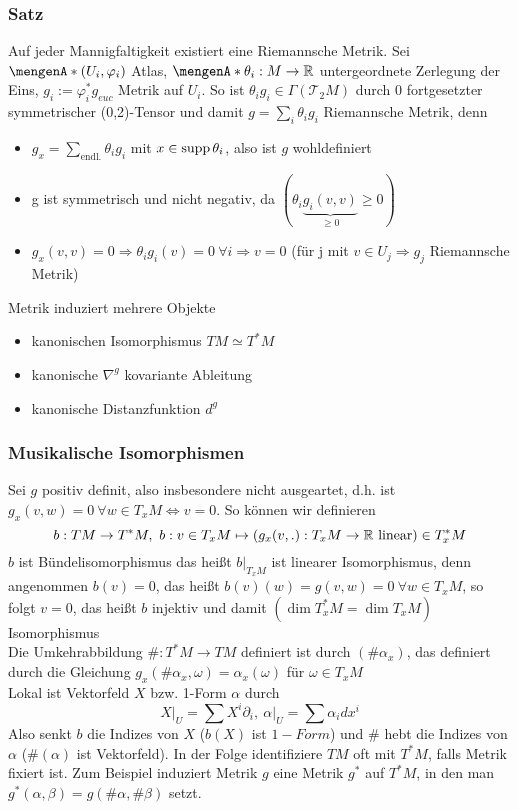 \subsubsection{Satz}
\label{ssub:25}
Auf jeder Mannigfaltigkeit existiert eine Riemannsche Metrik.
Sei $\set{(U_i,\varphi_i)}$ Atlas, $\set{\theta_i:M\to\mathds{R}}$ untergeordnete Zerlegung der Eins, $g_i:=\varphi_i^*g_{euc}$ Metrik auf $U_i$. So ist $\theta_i g_i\in\Gamma(\mathcal{T}_2 M)$ durch 0 fortgesetzter symmetrischer (0,2)-Tensor und damit $g=\sum_i \theta_i g_i$ Riemannsche Metrik, denn 
\begin{itemize}
\item $g_x=\sum_{\text{endl.}} \theta_i g_i$ mit $x\in \operatorname{supp} \theta_i$, also ist $g$ wohldefiniert
\item g ist symmetrisch und nicht negativ, da $(\theta_i\underset{\geq 0}{\underbrace{g_i(v,v)}}\geq 0)$
\item $g_x(v,v)=0\Rightarrow \theta_ig_i(v)=0~\forall i\Rightarrow v=0$ (für j mit $v\in U_j\Rightarrow g_j$ Riemannsche Metrik)
\end{itemize}

Metrik induziert mehrere Objekte 
\begin{itemize}
\item kanonischen Isomorphismus $TM\simeq T^*M$
\item kanonische $\nabla^g$ kovariante Ableitung
\item kanonische Distanzfunktion $d^g$
\end{itemize}

\subsubsection{Musikalische Isomorphismen}
\label{ssub:26}
Sei $g$ positiv definit, also insbesondere nicht ausgeartet, d.h. ist $g_x(v,w)=0~\forall w\in T_xM\iff v=0$. So können wir definieren
\[
b:TM\to T^* M,\ b: v\in T_x M\mapsto \enbrace*{g_x (v,.):T_x M\to\mathds{R}\ \text{linear}}\in T_x^* M
\]
$b$ ist Bündelisomorphismus das heißt $b\vert_{T_x M}$ ist linearer Isomorphismus, denn angenommen $b(v)=0$, das heißt $b(v)(w) = g(v,w) = 0\ \forall w\in T_x M$, so folgt $v=0$, das heißt $b$ injektiv und damit $(\dim T_x^* M = \dim T_x M)$ Isomorphismus\\
Die Umkehrabbildung $\#:T^* M\to TM$ definiert ist durch $(\#\alpha_x)$, das definiert durch die Gleichung $g_x(\#\alpha_x,\omega)=\alpha_x(\omega)$ für $\omega\in T_x M$\\
Lokal ist Vektorfeld $X$ bzw. 1-Form $\alpha$ durch 
\[X\vert_U=\sum X^i\partial_i,\ \alpha\vert_U=\sum\alpha_idx^i\]
Also senkt $b$ die Indizes von $X$ ($b(X)$ ist $1-Form$) und $\#$ hebt die Indizes von $\alpha$ ($\#(\alpha)$ ist Vektorfeld).
In der Folge identifiziere $TM$ oft mit $T^*M$, falls Metrik fixiert ist. Zum Beispiel induziert Metrik $g$ eine Metrik $g^*$ auf $T^* M$, in den man $g^*(\alpha,\beta)=g(\#\alpha,\#\beta)$ setzt. 

